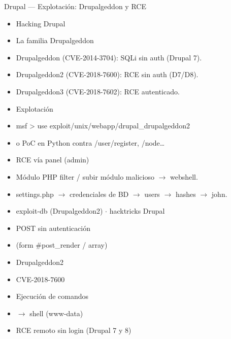 \documentclass[aspectratio=169,10pt]{beamer}
\begin{document}
\begin{frame}[allowframebreaks]{Drupal --- Explotación: Drupalgeddon y RCE}
\small
  \begin{itemize}
  \item Hacking Drupal
  \item La familia Drupalgeddon
  \item Drupalgeddon (CVE-2014-3704): SQLi sin auth (Drupal 7).
  \item Drupalgeddon2 (CVE-2018-7600): RCE sin auth (D7/D8).
  \item Drupalgeddon3 (CVE-2018-7602): RCE autenticado.
  \item Explotación
  \item msf \textgreater{} use exploit/unix/webapp/drupal\_drupalgeddon2
  \item o PoC en Python contra /user/register, /node\dots{}
  \item RCE vía panel (admin)
  \item Módulo PHP filter / subir módulo malicioso $\rightarrow$ webshell.
  \item settings.php $\rightarrow$ credenciales de BD $\rightarrow$ users $\rightarrow$ hashes $\rightarrow$ john.
  \item exploit-db (Drupalgeddon2) $\cdot$ hacktricks Drupal
  \item POST sin autenticación
  \item (form \#post\_render / array)
  \item Drupalgeddon2
  \item CVE-2018-7600
  \item Ejecución de comandos
  \item $\rightarrow$ shell (www-data)
  \item RCE remoto sin login (Drupal 7 y 8)
  \end{itemize}
\end{frame}
\end{document}
